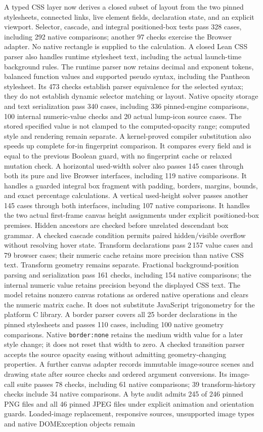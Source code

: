 \documentclass[11pt,a4paper]{article}
\numberwithin{equation}{section}
\theoremstyle{definition}
\theoremstyle{remark}
\begin{document}
A typed CSS layer now derives a closed subset of layout from the two pinned stylesheets, connected links, live element fields, declaration state, and an explicit viewport. Selector, cascade, and integral positioned-box tests pass 328 cases, including 292 native comparisons; another 97 checks exercise the Browser adapter. No native rectangle is supplied to the calculation. A closed Lean CSS parser also handles runtime stylesheet text, including the actual launch-time background rules. The runtime parser now retains decimal and exponent tokens, balanced function values and supported pseudo syntax, including the Pantheon stylesheet. Its 473 checks establish parser equivalence for the selected syntax; they do not establish dynamic selector matching or layout. Native opacity storage and text serialization pass 340 cases, including 336 pinned-engine comparisons, 100 internal numeric-value checks and 20 actual lump-icon source cases. The stored specified value is not clamped to the computed-opacity range; computed style and rendering remain separate. A kernel-proved compiler substitution also speeds up complete for-in fingerprint comparison. It compares every field and is equal to the previous Boolean guard, with no fingerprint cache or relaxed mutation check. A horizontal used-width solver also passes 145 cases through both its pure and live Browser interfaces, including 119 native comparisons. It handles a guarded integral box fragment with padding, borders, margins, bounds, and exact percentage calculations. A vertical used-height solver passes another 145 cases through both interfaces, including 107 native comparisons. It handles the two actual first-frame canvas height assignments under explicit positioned-box premises. Hidden ancestors are checked before unrelated descendant box grammar. A checked cascade condition permits paired hidden/visible overflow without resolving hover state. Transform declarations pass 2\,157 value cases and 79 browser cases; their numeric cache retains more precision than native CSS text. Transform geometry remains separate. Fractional background-position parsing and serialization pass 161 checks, including 154 native comparisons; the internal numeric value retains precision beyond the displayed CSS text. The model retains nonzero canvas rotations as ordered native operations and clears the numeric matrix cache. It does not substitute JavaScript trigonometry for the platform C library. A border parser covers all 25 border declarations in the pinned stylesheets and passes 110 cases, including 100 native geometry comparisons. Native \texttt{border:none} retains the medium width value for a later style change; it does not reset that width to zero. A checked transition parser accepts the source opacity easing without admitting geometry-changing properties. A further canvas adapter records immutable image-source scenes and drawing state after source checks and ordered argument conversions. Its image-call suite passes 78 checks, including 61 native comparisons; 39 transform-history checks include 34 native comparisons. A byte audit admits 245 of 246 pinned PNG files and all 46 pinned JPEG files under explicit animation and orientation guards. Loaded-image replacement, responsive sources, unsupported image types and native DOMException objects remain 
\end{document}

